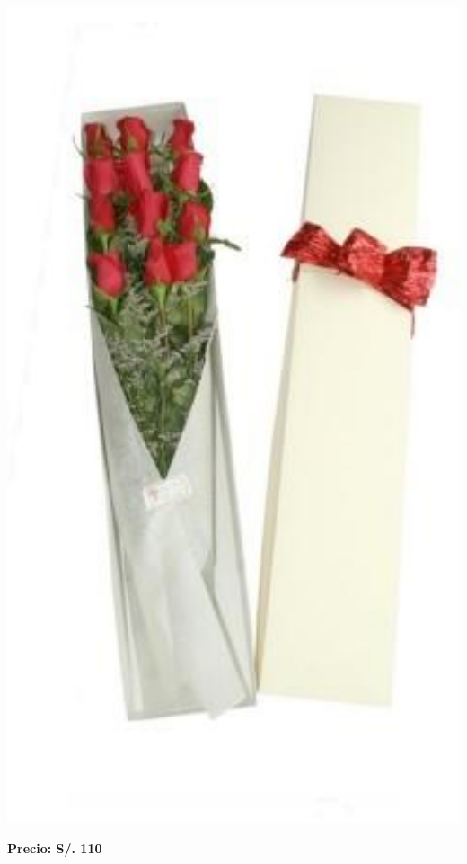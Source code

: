 \documentclass{article}
\begin{document}
\begin{minipage}{0.35\textwidth}
    \includegraphics[width=1.0\textwidth]{imagenes_extraidas/image_5_3}
\end{minipage}
\vspace{0.3cm}
\begin{center}
   \textbf{\Large Precio: \textcolor{cpred}{S/. 110 }}
\end{center}
\vspace{1cm}
\noindent
\end{document}

